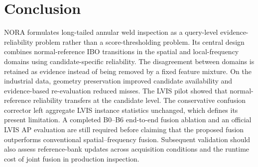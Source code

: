 \section{Conclusion}

NORA formulates long-tailed annular weld inspection as a query-level evidence-reliability problem rather than a score-thresholding problem. Its central design combines normal-reference IBO transitions in the spatial and local-frequency domains using candidate-specific reliability. The disagreement between domains is retained as evidence instead of being removed by a fixed feature mixture. On the industrial data, geometry preservation improved candidate availability and evidence-based re-evaluation reduced misses. The LVIS pilot showed that normal-reference reliability transfers at the candidate level. The conservative confusion corrector left aggregate LVIS instance statistics unchanged, which defines its present limitation. A completed B0--B6 end-to-end fusion ablation and an official LVIS AP evaluation are still required before claiming that the proposed fusion outperforms conventional spatial--frequency fusion. Subsequent validation should also assess reference-bank updates across acquisition conditions and the runtime cost of joint fusion in production inspection.
